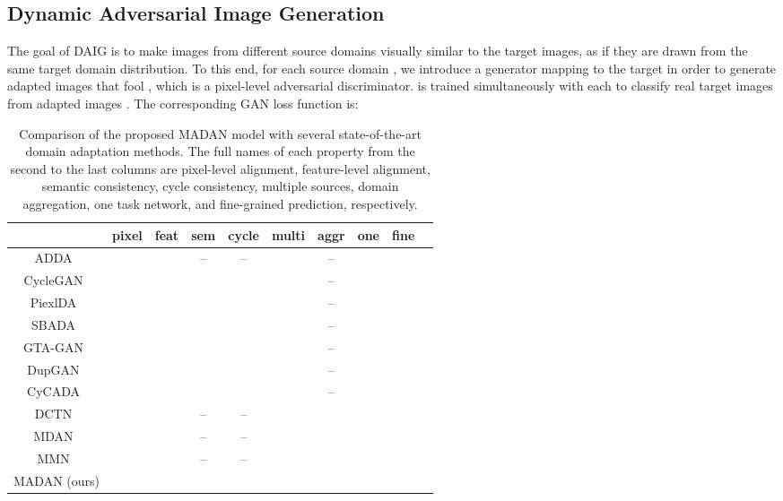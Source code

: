 \documentclass{article}
\newcommand{\cmark}{\textcolor{ForestGreen}{\ding{51}}}\newcommand{\xmark}{\textcolor{Maroon}{\ding{55}}}
\begin{document}
\subsection{Dynamic Adversarial Image Generation}
The goal of DAIG is to make images from different source domains visually similar to the target images, as if they are drawn from the same target domain distribution. To this end, for each source domain , we introduce a generator  mapping to the target  in order to generate adapted images that fool , which is a pixel-level adversarial discriminator.  is trained simultaneously with each  to classify real target images  from adapted images . The corresponding GAN loss function is:



\begin{table*}[!t]
\centering\small \caption{Comparison of the proposed MADAN model with several state-of-the-art domain adaptation methods. The full names of each property from the second to the last columns are pixel-level alignment, feature-level alignment, semantic consistency, cycle consistency, multiple sources, domain aggregation, one task network, and fine-grained prediction, respectively.}
\begin{tabular}
{c c c c c c c c c c}
\toprule
& pixel & feat & sem & cycle & multi & aggr & one & fine \\
\hline
ADDA~\cite{tzeng2017adversarial} & \xmark  & \cmark & -- &  -- & \xmark  & -- & \cmark & \cmark  \\
CycleGAN~\cite{zhu2017unpaired} & \cmark  & \xmark & \xmark &  \cmark & \xmark  & -- & \cmark & \xmark  \\
PiexlDA~\cite{bousmalis2017unsupervised} & \cmark  & \xmark & \xmark &  \xmark & \xmark  & -- & \cmark & \cmark  \\
SBADA~\cite{russo2018source} & \cmark  & \xmark & \cmark &  \cmark & \xmark  & -- & \cmark & \xmark  \\
GTA-GAN~\cite{sankaranarayanan2018generate} & \cmark  & \cmark & \xmark &  \xmark & \xmark  & -- & \cmark & \xmark  \\
DupGAN~\cite{hu2018duplex} & \cmark  & \cmark & \cmark &  \xmark & \xmark  & -- & \cmark & \xmark  \\
CyCADA~\cite{hoffman2018cycada} & \cmark  & \cmark & \cmark &  \cmark & \xmark  & -- & \cmark & \cmark  \\
\hline
DCTN~\cite{xu2018deep} & \xmark  & \cmark & -- &  -- & \cmark  & \xmark & \xmark & \xmark  \\
MDAN~\cite{zhao2018adversarial} & \xmark  & \cmark &  -- &  -- & \cmark  & \xmark & \cmark & \xmark  \\
MMN~\cite{peng2018moment} & \xmark  & \cmark &  -- &  -- & \cmark  & \xmark & \xmark & \xmark  \\
MADAN (ours) & \cmark  & \cmark &  \cmark &  \cmark & \cmark  & \cmark & \cmark & \cmark  \\
\bottomrule
\end{tabular}
\label{tab:propertyComparison}
\end{table*}
\end{document}
